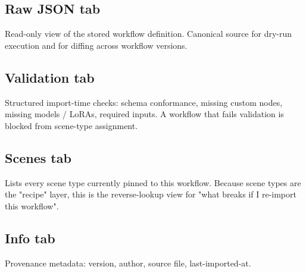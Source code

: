 \begin{itemize}
\end{itemize}

\subsection{Raw JSON tab}
Read-only view of the stored workflow definition. Canonical source for dry-run
execution and for diffing across workflow versions.
\begin{itemize}
\end{itemize}

\subsection{Validation tab}
Structured import-time checks: schema conformance, missing custom nodes, missing
models / LoRAs, required inputs. A workflow that fails validation is blocked
from scene-type assignment.
\begin{itemize}
\end{itemize}

\subsection{Scenes tab}
Lists every scene type currently pinned to this workflow. Because scene types
are the "recipe" layer, this is the reverse-lookup view for "what breaks if I
re-import this workflow".
\begin{itemize}
\end{itemize}

\subsection{Info tab}
Provenance metadata: version, author, source file, last-imported-at.
\begin{itemize}
\end{itemize}
